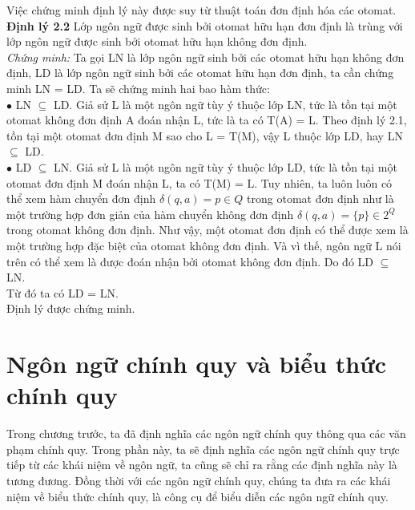 \begin{flushleft}
Việc chứng minh định lý này được suy từ thuật toán đơn định hóa các otomat.\\
\textbf{Định lý 2.2} 
Lớp ngôn ngữ được sinh bởi otomat hữu hạn đơn định là trùng với lớp ngôn ngữ được sinh bởi otomat hữu hạn không đơn định.\\
\textit{Chứng minh:} Ta gọi LN là lớp ngôn ngữ sinh bởi các otomat hữu hạn không đơn định, LD là lớp ngôn ngữ sinh bởi các otomat hữu hạn đơn định, ta cần chứng minh LN = LD. Ta sẽ chứng minh hai bao hàm thức:\\
\hspace{10mm}$\bullet$ LN $\subseteq$ LD. Giả sử L là một ngôn ngữ tùy ý thuộc lớp LN, tức là tồn tại một otomat không đơn định A đoán nhận L, tức là ta có T(A) = L. Theo định lý 2.1, tồn tại một otomat đơn định M sao cho L = T(M), vậy L thuộc lớp LD, hay LN $\subseteq$ LD.\\
\hspace{10mm}$\bullet$ LD $\subseteq$ LN. Giả sử L là một ngôn ngữ tùy ý thuộc lớp LD, tức là tồn tại một otomat đơn định M đoán nhận L, ta có T(M) = L. Tuy nhiên, ta luôn luôn có thể xem hàm chuyển đơn định $\delta(q, a) = p \in Q$ trong otomat đơn định như là một trường hợp đơn giản của hàm chuyển không đơn định $\delta(q, a) = \{p\} \in 2^Q$ trong otomat không đơn định. Như vậy, một otomat đơn định có thể được xem là một trường hợp đặc biệt của otomat không đơn định. Và vì thế, ngôn ngữ L nói trên có thể xem là được đoán nhận bởi otomat không đơn định. Do đó LD $\subseteq$ LN. \\
\hspace{10mm}Từ đó ta có LD = LN.\\
Định lý được chứng minh.\\
\section{Ngôn ngữ chính quy và biểu thức chính quy}
\hspace{10mm}Trong chương trước, ta đã định nghĩa các ngôn ngữ chính quy thông qua các văn phạm chính quy. Trong phần này, ta sẽ định nghĩa các ngôn ngữ chính quy trực tiếp từ các khái niệm về ngôn ngữ, ta cũng sẽ chỉ ra rằng các định nghĩa này là tương đương. Đồng thời với các ngôn ngữ chính quy, chúng ta đưa ra các khái niệm về biểu thức chính quy, là công cụ để biểu diễn các ngôn ngữ chính quy.\\

\end{flushleft}
